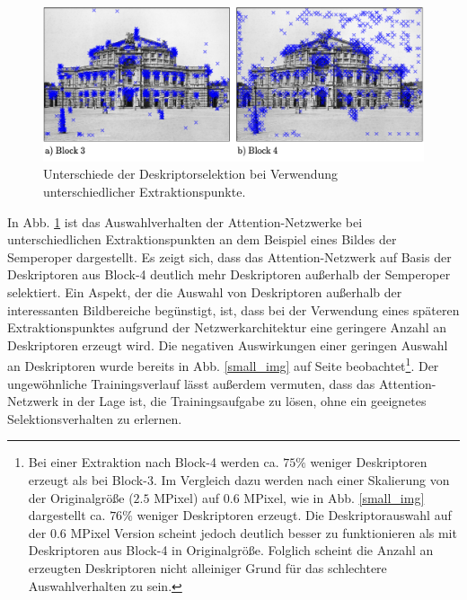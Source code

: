 \begin{figure}[h]
\centering
\includegraphics[scale=0.79]{attention_layer_diff}
\caption{Unterschiede der Deskriptorselektion bei Verwendung unterschiedlicher Extraktionspunkte.}
\label{attention_layer_diff}
\end{figure}
In Abb. \ref{attention_layer_diff} ist das Auswahlverhalten der Attention-Netzwerke bei unterschiedlichen Extraktionspunkten an dem Beispiel eines Bildes der Semperoper dargestellt. Es zeigt sich, dass das Attention-Netzwerk auf Basis der Deskriptoren aus Block-4 deutlich mehr Deskriptoren außerhalb der Semperoper selektiert.
Ein Aspekt, der die Auswahl von Deskriptoren außerhalb der interessanten Bildbereiche begünstigt, ist, dass bei der Verwendung eines späteren Extraktionspunktes aufgrund der Netzwerkarchitektur eine geringere Anzahl an Deskriptoren erzeugt wird. Die negativen Auswirkungen einer geringen Auswahl an Deskriptoren wurde bereits in Abb. \ref{small_img} auf Seite \pageref{small_img} beobachtet\footnote{Bei einer Extraktion nach Block-4 werden ca. $75 \%$ weniger Deskriptoren erzeugt als bei Block-3. Im Vergleich dazu werden nach einer Skalierung von der Originalgröße ($2.5$ MPixel) auf $0.6$ MPixel, wie in Abb. \ref{small_img} dargestellt ca. $76 \%$ weniger Deskriptoren erzeugt. Die Deskriptorauswahl auf der $0.6$ MPixel Version scheint jedoch deutlich besser zu funktionieren als mit Deskriptoren aus Block-4 in Originalgröße. Folglich scheint die Anzahl an erzeugten Deskriptoren nicht alleiniger Grund für das schlechtere Auswahlverhalten zu sein.}. Der ungewöhnliche Trainingsverlauf lässt außerdem vermuten, dass das Attention-Netzwerk in der Lage ist, die Trainingsaufgabe zu lösen, ohne ein geeignetes Selektionsverhalten zu erlernen.
\\
